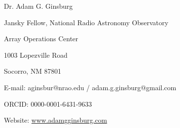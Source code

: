\begin{center}
{\large Dr. Adam G. Ginsburg}\\
\par Jansky Fellow, National Radio Astronomy Observatory
\par Array Operations Center
\par 1003 Lopezville Road
\par Socorro, NM 87801
\par E-mail: aginsbur@nrao.edu / adam.g.ginsburg@gmail.com
\par ORCID: 0000-0001-6431-9633
\par Website: \url{www.adamgginsburg.com}
\end{center}

